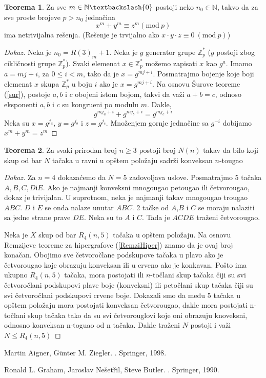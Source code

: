 \documentclass{article}
\theoremstyle{definition}
\newtheorem{teorema}{Teorema}[section]
\newcommand{\dokaz}[1]{\begin{proof}[Dokaz]#1\end{proof}}
\begin{document}
	\begin{teorema} \label{sur2}
		 Za sve $m \in \mathbb{N} \textbackslash \{0\}$ postoji neko $n_{0} \in \mathbb{N}$, takvo da za sve proste brojeve $p>n_{0}$ jednačina
		\[
		x^{m}+y^{m}\equiv z^{m} (\mathrm{mod} \: p) 
		\]
		ima netrivijalna rešenja. (Rešenje je trvijalno ako $x\cdot y \cdot z\equiv 0\: (\mathrm{mod} \: p)$)
	\end{teorema}
	\dokaz{
		Neka je $n_0=R(3)_m+1$. Neka je $g$ generator grupe $\mathbb{Z}_{p}^{*} $ ($g$ postoji zbog cikličnosti grupe $\mathbb{Z}_{p}^{*}$). Svaki elemenat $x\in\mathbb{Z}_{p}^{*}$ možemo zapisati $x$ kao $g^a$. Imamo $a=mj+i$, za $0\leq i < m$, tako da je $x=g^{mj+i}$. Posmatrajmo bojenje koje boji elemenat $x$ skupa $\mathbb{Z}_{p}^{*}$ u boju $i$ ako je $x=g^{mj+i}$. Na osnovu Šurove teoreme (\ref{sur}), postoje $a, b$ i $c$ obojeni istom bojom, takvi da važi $a+b=c$, odnoso eksponenti $a, b$ i $c$ su kongrueni po modulu $m$. Dakle,
		\[
			g^{mj_{a}+i}+g^{mj_{b}+i}=g^{mj_{c}+i}
		\]
		Neka su $x=g^{j_{a}}$, $y=g^{j_{b}}$ i $z=g^{j_{c}}$. Množenjem gornje jednačine sa $g^{-i}$ dobijamo $x^m+y^m=z^m$  
	}
	\begin{teorema}
		Za svaki prirodan broj $n\geq 3$ postoji broj $N(n)$ takav da bilo koji skup od bar $N$ tačaka u ravni u opštem položaju sadrži konveksan $n$-tougao
	\end{teorema}
	\dokaz{
		Za $n=4$ dokazaćemo da $N=5$ zadovoljava uslove. Posmatrajmo 5 tačaka $A,B,C,D \mathrm{i} E$. Ako je najmanji konveksni mnogougao petougao ili četvorougao, dokaz je trivijalan. U suprotnom, neka je najmanji takav mnogougao trougao $ABC$. $D$ i $E$ se onda nalaze unutar $ABC$. 2 tačke od $A$,$B$ i $C$ se moraju nalaziti sa jedne strane prave $DE$. Neka su to $A$ i $C$. Tada je $ACDE$ traženi četvorougao.
		
		Neka je $X$ skup od bar $R_4(n,5)$ tačaka u opštem položaju. Na osnovu Remzijeve teoreme za hipergrafove (\ref{RemziHiper}) znamo da je ovaj broj konačan. Obojimo sve četvoročlane podskupove tačaka u plavo ako je četvorougao koje obrazuju konveksan ili u crveno ako je konkavan. Pošto ima ukupno $R_{4}(n,5)$ tačaka, mora postojati ili $n$-točlani skup tačaka čiji su svi četvoročlani podskupovi plave boje (konveksni) ili petočlani skup tačaka čiji su svi četvoročlani podskupovi crvene boje. Dokazali smo da među 5 tačaka u opštem položaju mora postojati konveksan četvorougao, dakle mora postojati n-točlani skup tačaka tako da su svi četvorouglovi koje oni obrazuju knoveksni, odnosno konveksan n-toguao od n tačaka. Dakle traženi $N$ postoji i važi $N\leq R_{4}(n,5)$
		  
	}


	\newpage
	
\begin{thebibliography}{99}
	Martin Aigner, Günter M. Ziegler.
	.
	\newblock Springer, 1998.
	
	Ronald L. Graham, Jaroslav Nešetřil, Steve Butler.
	.
	\newblock Springer, 1990.
	
\end{thebibliography}	
	
\end{document}
